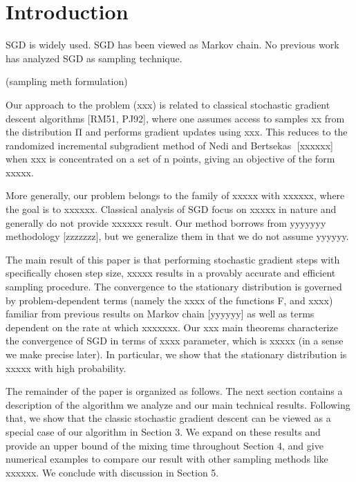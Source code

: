 \documentclass[preprint,12pt,3p]{elsarticle}
\begin{document}
\section{Introduction} %
\label{sec:introduction}

SGD is widely used.
SGD has been viewed as Markov chain.
No previous work has analyzed SGD as sampling technique.


(sampling meth formulation)

Our approach to the problem (xxx) is related to classical stochastic gradient descent algorithms [RM51, PJ92], where one assumes access to samples xx from the distribution Π and performs gradient updates using xxx. This reduces to the randomized incremental subgradient method of Nedi and Bertsekas􏰇 [xxxxxx] when xxx is concentrated on a set of n points, giving an objective of the form xxxxx.

More generally, our problem belongs to the family of xxxxx with xxxxxx, where the goal is to xxxxxx. Classical analysis of SGD focus on xxxxx in nature and generally do not provide xxxxxx result. Our method borrows from yyyyyyy methodology [zzzzzzz], but we generalize them in that we do not assume yyyyyy.

The main result of this paper is that performing stochastic gradient steps with specifically chosen step size, xxxxx results in a provably accurate and efficient sampling procedure. The convergence to the stationary distribution is governed by problem-dependent terms (namely the xxxx of the functions F, and xxxx) familiar from previous results on Markov chain [yyyyyy] as well as terms dependent on the rate at which xxxxxxx. Our xxx main theorems characterize the convergence of SGD in terms of xxxx parameter, which is xxxxx (in a sense we make precise later). In particular, we show that the stationary distribution is xxxxx with high probability.

The remainder of the paper is organized as follows. The next section contains a description of the algorithm we analyze and our main technical results. Following that, we show that the classic stochastic gradient descent can be viewed as a special case of our algorithm in Section 3. We expand on these results and provide an upper bound of the mixing time throughout Section 4, and give numerical examples to compare our result with other sampling methods like xxxxxx. We conclude with discussion in Section 5.
\end{document}
